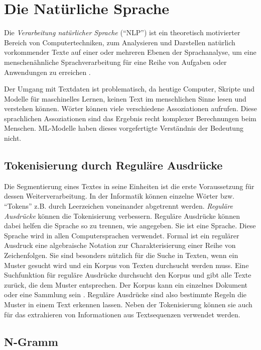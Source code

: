 \chapter{Die Natürliche Sprache}\label{ch3}


Die \textit{Verarbeitung natürlicher Sprache} (\enquote{NLP}) ist ein theoretisch motivierter Bereich von Computertechniken, zum Analysieren und Darstellen natürlich vorkommender Texte auf einer oder mehreren Ebenen der Sprachanalyse, um eine menschenähnliche Sprachverarbeitung für eine Reihe von Aufgaben oder Anwendungen zu erreichen \cite*{Liddy}.

Der Umgang mit Textdaten ist problematisch, da heutige Computer, Skripte und Modelle für maschinelles Lernen, keinen Text im menschlichen Sinne lesen und verstehen können. Wörter können viele verschiedene Assoziationen aufrufen. Diese sprachlichen Assoziationen sind das Ergebnis recht komplexer Berechnungen beim Menschen. ML-Modelle haben dieses vorgefertigte Verständnis der Bedeutung nicht.


\section{Tokenisierung durch Reguläre Ausdrücke}
Die Segmentierung eines Textes in seine Einheiten ist die erste Voraussetzung für dessen Weiterverarbeitung. In der Informatik können einzelne Wörter bzw. \enquote{Tokens} z.B. durch Leerzeichen voneinander abgetrennt werden. \textit{Reguläre Ausdrücke} können die Tokenisierung verbessern. Reguläre Ausdrücke können dabei helfen die Sprache so zu trennen, wie angegeben. Sie ist eine Sprache. Diese Sprache wird in allen Computersprachen verwendet. Formal ist ein regulärer Ausdruck eine algebraische Notation zur Charakterisierung einer Reihe von Zeichenfolgen. Sie sind besonders nützlich für die Suche in Texten, wenn ein Muster gesucht wird und ein Korpus von Texten durchsucht werden muss. Eine Suchfunktion für reguläre Ausdrücke durchsucht den Korpus und gibt alle Texte zurück, die dem Muster entsprechen. Der Korpus kann ein einzelnes Dokument oder eine Sammlung sein \cite*[3]{Jurafskya}. Reguläre Ausdrücke sind also bestimmte Regeln die Muster in einem Text erkennen lassen. Neben der Tokenisierung können sie auch für das extrahieren von Informationen aus Textsequenzen verwendet werden.

\section{N-Gramm}

